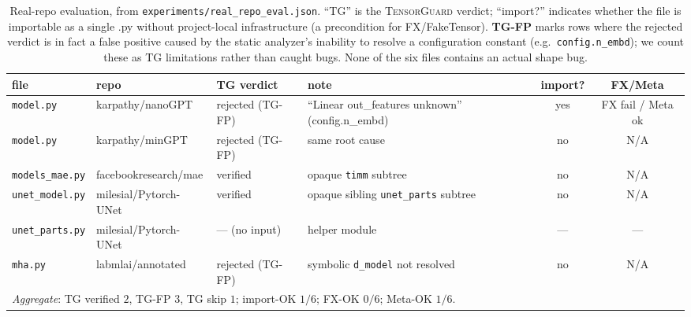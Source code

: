 \documentclass{article}
\theoremstyle{definition}
\begin{document}
\begin{table}[t]
\centering\small
\caption{Real-repo evaluation, from
\texttt{experiments/real\_repo\_eval.json}. ``TG'' is the
\textsc{TensorGuard} verdict; ``import?'' indicates whether the
file is importable as a single .py without project-local
infrastructure (a precondition for FX/FakeTensor). \textbf{TG-FP}
marks rows where the \textsf{rejected} verdict is in fact a false
positive caused by the static analyzer's inability to resolve a
configuration constant (e.g.\ \texttt{config.n\_embd}); we count
these as TG limitations rather than caught bugs. None of the six
files contains an actual shape bug.}
\label{tab:real-repo}
\begin{tabular}{lp{3.0cm}llcc}
\toprule
file & repo & TG verdict & note & import? & FX/Meta \\
\midrule
\texttt{model.py}    & karpathy/nanoGPT  & \textsf{rejected} (TG-FP) & ``Linear out\_features unknown'' (config.n\_embd) & yes & FX fail / Meta ok \\
\texttt{model.py}    & karpathy/minGPT   & \textsf{rejected} (TG-FP) & same root cause                          & no  & N/A \\
\texttt{models\_mae.py} & facebookresearch/mae & \textsf{verified} & opaque \texttt{timm} subtree                 & no  & N/A \\
\texttt{unet\_model.py} & milesial/Pytorch-UNet & \textsf{verified} & opaque sibling \texttt{unet\_parts} subtree   & no  & N/A \\
\texttt{unet\_parts.py} & milesial/Pytorch-UNet & --- (no input)    & helper module                                 & ---  & --- \\
\texttt{mha.py}      & labmlai/annotated  & \textsf{rejected} (TG-FP) & symbolic \texttt{d\_model} not resolved   & no  & N/A \\
\midrule
\multicolumn{6}{l}{\emph{Aggregate}: TG verified $2$, TG-FP $3$, TG skip $1$;
import-OK $1/6$; FX-OK $0/6$; Meta-OK $1/6$.} \\
\bottomrule
\end{tabular}
\end{table}
\end{document}
